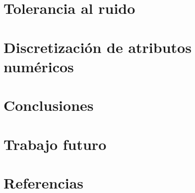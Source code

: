 \documentclass[]{article}
\begin{document}
\section{Tolerancia al ruido}

\section{Discretización de atributos numéricos}

\section*{Conclusiones}

\section*{Trabajo futuro}



\section*{Referencias}
\end{document}
